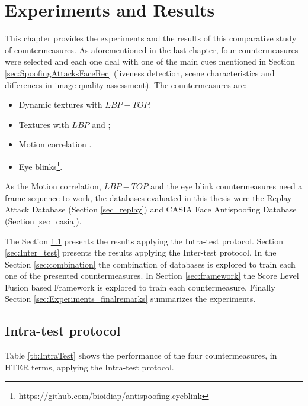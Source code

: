 \chapter{Experiments and Results}
\label{chap:Experiments_Results}

This chapter provides the experiments and the results of this comparative study of countermeasures. As aforementioned in the last chapter, four countermeasures were selected and each one deal with one of the main cues mentioned in Section \ref{sec:SpoofingAttacksFaceRec} (liveness detection, scene characteristics and differences in image quality assessment). The countermeasures are:

\begin{itemize}
        \item Dynamic textures with $LBP-TOP$;
        \item Textures with $LBP$ \cite{ChingovskaBIOSIG2012} and \cite{maatta2011face};
        \item Motion correlation \cite{AnjosIJCB2011}.
        \item Eye blinks\footnote{https://github.com/bioidiap/antispoofing.eyeblink}.
\end{itemize}

As the Motion correlation, $LBP-TOP$ and the eye blink countermeasures need a frame sequence to work, the databases evaluated in this thesis were the Replay Attack Database (Section \ref{sec_replay}) and CASIA Face Antispoofing Database (Section \ref{sec_casia}).

The Section \ref{sec:Intra_test} presents the results applying the Intra-test protocol. Section \ref{sec:Inter_test} presents the results applying the Inter-test protocol. In the Section \ref{sec:combination} the combination of databases is explored to train each one of the presented countermeasures. In Section \ref{sec:framework} the Score Level Fusion based Framework is explored to train each countermeasure. Finally Section \ref{sec:Experiments_finalremarks} summarizes the experiments.

\section{Intra-test protocol}
\label{sec:Intra_test}

Table \ref{tb:IntraTest} shows the performance of the four countermeasures, in HTER terms, applying the Intra-test protocol.


